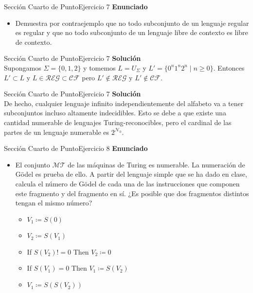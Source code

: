 \documentclass[10pt, envcountsect, presentation, aspectratio=169]{beamer}
\newcommand{\mt}{\ensuremath{\mathcal {MT}}}
\begin{document}

\begin{frame}{Sección Cuarto de Punto}{Ejercicio 7}
\textbf{Enunciado}
	\begin{itemize}
        \item Demuestra por contraejemplo que no todo subconjunto de un lenguaje regular es regular y que no todo subconjunto de un lenguaje libre de contexto es libre de contexto.
    \end{itemize}
\end{frame}


\begin{frame}{Sección Cuarto de Punto}{Ejercicio 7}
    \textbf{Solución}\\
    Supongamos $\Sigma = \{0,1,2\}$ y tomemos $L = U_\Sigma$ y $L'=\{0^n1^n2^n \mid n \geq 0 \}.$ Entonces $L' \subset L \text{ y } L \in \mathcal{REG} \subset \mathcal{CF}$ pero $L' \notin \mathcal{REG} \text{ y } L' \notin \mathcal{CF}.$
\end{frame}


\begin{frame}{Sección Cuarto de Punto}{Ejercicio 7}
    \textbf{Solución}\\
    De hecho, cualquier lenguaje infinito independientemente del alfabeto va a tener subconjuntos incluso altamente indecidibles. Esto se debe a que existe una cantidad numerable de lenguajes Turing-reconocibles, pero el cardinal de las partes de un lenguaje numerable es $2^{\mathcal{N}_0}.$
\end{frame}


\begin{frame}{Sección Cuarto de Punto}{Ejercicio 8}
    \textbf{Enunciado}
    \begin{itemize}
        \item El conjunto $\mt$ de las máquinas de Turing es numerable. La numeración de Gödel es prueba de ello. A partir del lenguaje simple que se ha dado en clase, calcula el número de Gödel de cada una de las instrucciones que componen este fragmento y del fragmento en sí. ¿Es posible que dos fragmentos distintos tengan el mismo número?
        \begin{itemize}
            \item[] $V_1 \coloneqq S(0)$
            \item[] $V_2 \coloneqq S(V_1)$
            \item[] If $S(V_2)!=0$ Then $V_2 \coloneqq0$
            \item[] If $S(V_1)=0$ Then $V_1 \coloneqq S(V_2)$
            \item[] $V_1 \coloneqq S(S(V_2))$
        \end{itemize}
    \end{itemize}
\end{frame}
\end{document}
